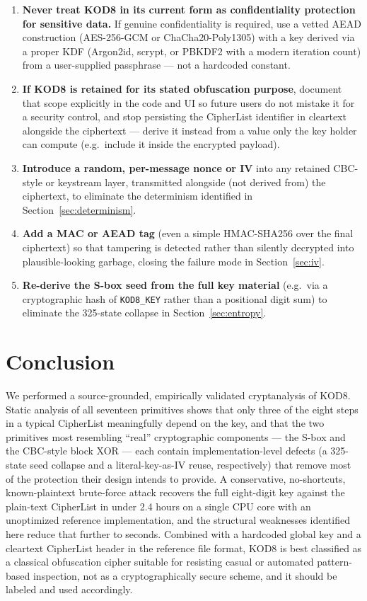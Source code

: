 \documentclass[11pt]{article}
\begin{document}
\begin{enumerate}[leftmargin=1.6em]
\item \textbf{Never treat KOD8 in its current form as confidentiality
protection for sensitive data.} If genuine confidentiality is required,
use a vetted AEAD construction (AES-256-GCM or ChaCha20-Poly1305) with a
key derived via a proper KDF (Argon2id, scrypt, or PBKDF2 with a modern
iteration count) from a user-supplied passphrase — not a hardcoded
constant.
\item \textbf{If KOD8 is retained for its stated obfuscation purpose},
document that scope explicitly in the code and UI so future users do
not mistake it for a security control, and stop persisting the
CipherList identifier in cleartext alongside the ciphertext — derive it
instead from a value only the key holder can compute (e.g.\ include it
inside the encrypted payload).
\item \textbf{Introduce a random, per-message nonce or IV} into any
retained CBC-style or keystream layer, transmitted alongside (not
derived from) the ciphertext, to eliminate the determinism identified
in Section~\ref{sec:determinism}.
\item \textbf{Add a MAC or AEAD tag} (even a simple HMAC-SHA256 over the
final ciphertext) so that tampering is detected rather than silently
decrypted into plausible-looking garbage, closing the failure mode in
Section~\ref{sec:iv}.
\item \textbf{Re-derive the S-box seed from the full key material}
(e.g.\ via a cryptographic hash of \texttt{KOD8\_KEY} rather than a
positional digit sum) to eliminate the 325-state collapse in
Section~\ref{sec:entropy}.
\end{enumerate}

\section{Conclusion}

We performed a source-grounded, empirically validated cryptanalysis of
KOD8. Static analysis of all seventeen primitives shows that only
three of the eight steps in a typical CipherList meaningfully depend on
the key, and that the two primitives most resembling ``real''
cryptographic components — the S-box and the CBC-style block XOR —
each contain implementation-level defects (a 325-state seed collapse and
a literal-key-as-IV reuse, respectively) that remove most of the
protection their design intends to provide. A conservative,
no-shortcuts, known-plaintext brute-force attack recovers the full
eight-digit key against the plain-text CipherList in under 2.4 hours on
a single CPU core with an unoptimized reference implementation, and the
structural weaknesses identified here reduce that further to seconds.
Combined with a hardcoded global key and a cleartext CipherList header
in the reference file format, KOD8 is best classified as a classical
obfuscation cipher suitable for resisting casual or automated
pattern-based inspection, not as a cryptographically secure scheme, and
it should be labeled and used accordingly.
\end{document}
